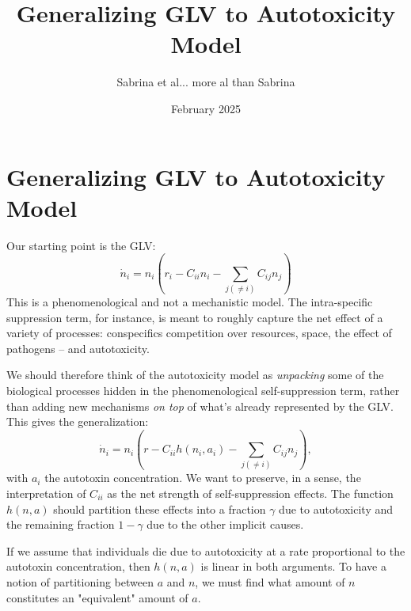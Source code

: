 \documentclass{article}
\author{Sabrina et al... more al than Sabrina}
\title{Generalizing GLV to Autotoxicity Model}
\date{February 2025}
\begin{document}
\maketitle

\section{Generalizing GLV to Autotoxicity Model}

Our starting point is the GLV:
\begin{equation}
\dot{n}_i = n_i\left( r_i - C_{ii} n_i - \sum_{j(\neq i)} C_{ij} n_j \right)
\end{equation}
This is a phenomenological and not a mechanistic model. The intra-specific suppression term, for instance, is meant to roughly capture the net effect of a variety of processes: conspecifics competition over resources, space, the effect of pathogens -- and autotoxicity. 

We should therefore think of the autotoxicity model as \emph{unpacking} some of the biological processes hidden in the phenomenological self-suppression term, rather than adding new mechanisms \emph{on top} of what's already represented by the GLV. This gives the generalization:
\begin{equation}
\dot{n}_i = n_i\left( r - C_{ii} h(n_i,a_i) - \sum_{j(\neq i)} C_{ij} n_j \right),
\end{equation}
with $a_i$ the autotoxin concentration. We want to preserve, in a sense, the interpretation of $C_{ii}$ as the net strength of self-suppression effects. The function $h(n,a)$ should partition these effects into a fraction $\gamma$ due to autotoxicity and the remaining fraction $1-\gamma$ due to the other implicit causes.

If we assume that individuals die due to autotoxicity at a rate proportional to the autotoxin concentration, then $h(n,a)$ is linear in both arguments. To have a notion of partitioning between $a$ and $n$, we must find what amount of $n$ constitutes an "equivalent" amount of $a$.
\end{document}
